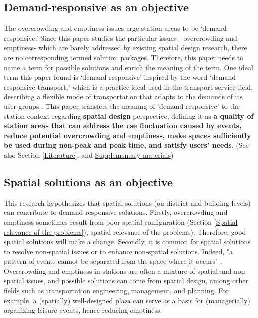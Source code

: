 \documentclass[]{article}
\begin{document}
\subsection{Demand-responsive as an objective}
\label{Demand-responsive as an objective}

The overcrowding and emptiness issues urge station areas to be `demand-responsive.' Since this paper studies the particular issues - overcrowding and emptiness- which are barely addressed by existing spatial design research, there are no corresponding termed solution packages. Therefore, this paper needs to name a term for possible solutions and enrich the meaning of the term. One ideal term this paper found is ‘demand-responsive’ inspired by the word ‘demand-responsive transport,’ which is a practice ideal \citep{enochWhyDemandResponsive2006} used in the transport service field, describing a flexible mode of transportation that adapts to the demands of its user groups \citep{hunkinDemandresponsiveTransportPolicy2018}. This paper transfers the meaning of ‘demand-responsive’ to the station context regarding \textbf{spatial design} perspective, defining it as \textbf{a quality of station areas that can address the use fluctuation caused by events, reduce potential overcrowding and emptiness, make spaces sufficiently be used during non-peak and peak time, and satisfy users’ needs}. (See also Section \ref{Literature}, and \href{https://github.com/1309928130/Paper3_SupplementaryMaterials/blob/main/SupplementaryMaterials.pdf}{Supplementary materials})




\subsection{Spatial solutions as an objective}

This research hypothesizes that spatial solutions (on district and building levels) can contribute to demand-responsive solutions. Firstly, overcrowding and emptiness sometimes result from poor spatial configuration (Section \ref{Spatial relevance of the problems}), spatial relevance of the problems). Therefore, good spatial solutions will make a change. Secondly, it is common for spatial solutions to resolve non-spatial issues or to enhance non-spatial solutions. Indeed, "a pattern of events cannot be separated from the space where it occurs" \citep[p. 73]{alexanderTimelessWayBuilding1979}. Overcrowding and emptiness in stations are often a mixture of spatial and non-spatial issues, and possible solutions can come from spatial design, among other fields such as transportation engineering, management, and planning. For example, a (spatially) well-designed plaza can serve as a basis for (managerially) organizing leisure events, hence reducing emptiness.
\end{document}
